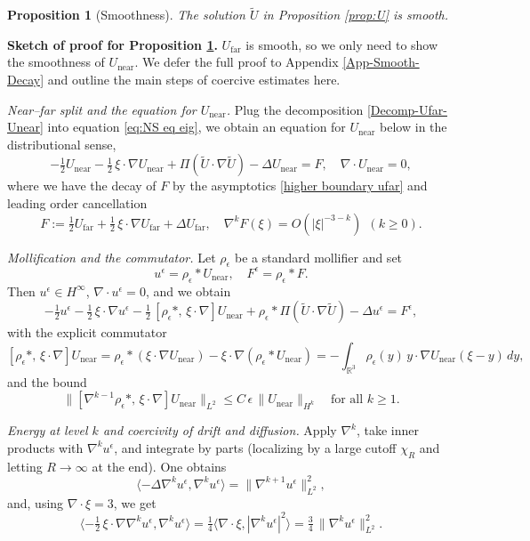 \documentclass[11pt,a4paper]{article}
\numberwithin{equation}{section}
\newcommand{\tmop}[1]{\ensuremath{\operatorname{#1}}}
\newtheorem{proposition}{Proposition}
{\theorembodyfont{\rmfamily}\newtheorem{remark}{Remark}}
\begin{document}
\begin{proposition}[Smoothness]
  The solution $\widetilde{U}$ in Proposition \ref{prop:U} is smooth. \label{prop smooth}
\end{proposition}

\medskip
\noindent\textbf{Sketch of proof for Proposition \ref{prop smooth}.} $U_{\tmop{far}}$ is smooth,  so we only need to show the smoothness of $U_{\tmop{near}}$. 
We defer the full proof to Appendix \ref{App-Smooth-Decay} and outline the main steps of coercive estimates here.





\smallskip
\noindent\emph{Near--far split and the equation for $U_{\mathrm{near}}$.}
Plug the decomposition \eqref{Decomp-Ufar-Unear} into equation \eqref{eq:NS eq eig}, we obtain an equation for $U_{\mathrm{near}}$ below in the distributional sense,
\[
-\tfrac12 U_{\mathrm{near}}-\tfrac12\,\xi\cdot\nabla U_{\mathrm{near}}
+\Pi(\widetilde U\cdot\nabla\widetilde U)-\Delta U_{\mathrm{near}}=F,
\quad
\nabla\cdot U_{\mathrm{near}}=0,
\]
where we have the decay of $F$ by the asymptotics \eqref{higher boundary ufar} and leading order cancellation 
\[
F:=\tfrac12U_{\mathrm{far}}+\tfrac12\,\xi\cdot\nabla U_{\mathrm{far}}+\Delta U_{\mathrm{far}},
\quad
\nabla^k F(\xi)=O(|\xi|^{-3-k}) \ \ (k\geqslant0).
\]

\smallskip
\noindent\emph{Mollification and the commutator.}
Let $\rho_\epsilon$ be a standard mollifier and set
\[
u^\epsilon=\rho_\epsilon*U_{\mathrm{near}},\quad F^\epsilon=\rho_\epsilon*F.
\]
Then $u^\epsilon\in H^\infty$, $\nabla\cdot u^\epsilon=0$, and we obtain
\[
-\tfrac12 u^\epsilon-\tfrac12\,\xi\cdot\nabla u^\epsilon
-\tfrac12\,[\rho_\epsilon*,\,\xi\cdot\nabla]U_{\mathrm{near}}
+\rho_\epsilon*\Pi(\widetilde U\cdot\nabla\widetilde U)
-\Delta u^\epsilon
=F^\epsilon,
\]
with the explicit commutator
\[
[\rho_\epsilon*,\,\xi\cdot\nabla]U_{\mathrm{near}}
=\rho_\epsilon*(\xi\cdot\nabla U_{\mathrm{near}})-\xi\cdot\nabla(\rho_\epsilon*U_{\mathrm{near}})
=-\int_{\mathbb{R}^3}\rho_\epsilon(y)\,y\cdot\nabla U_{\mathrm{near}}(\xi-y)\,dy,
\]
and the bound
\[
\|[\nabla^{k-1}\rho_\epsilon*,\,\xi\cdot\nabla]U_{\mathrm{near}}\|_{L^2}
\leqslant C\,\epsilon\,\|U_{\mathrm{near}}\|_{H^{k}}
\quad\text{for all }k\geqslant1.
\]

\smallskip
\noindent\emph{Energy at level $k$ and coercivity of drift and diffusion.}
Apply $\nabla^k$, take inner products with $\nabla^k u^\epsilon$, and integrate by parts (localizing by a large cutoff $\chi_R$ and letting $R\to\infty$ at the end). One obtains
\[
\langle-\Delta \nabla^k u^\epsilon, \nabla^k u^\epsilon\rangle
=\|\nabla^{k+1}u^\epsilon\|_{L^2}^2,
\]
and, using $\nabla\cdot\xi=3$, we get
\[
\langle-\tfrac12\,\xi\cdot\nabla \nabla^k u^\epsilon, \nabla^k u^\epsilon\rangle
=\tfrac14\langle\nabla\cdot\xi,|\nabla^k u^\epsilon|^2\rangle
=\tfrac34\,\|\nabla^k u^\epsilon\|_{L^2}^2.
\]
\end{document}
